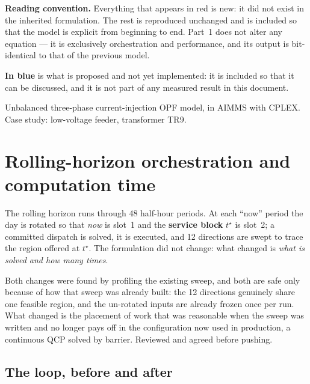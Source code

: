 \documentclass[11pt,a4paper]{article}
\newcommand{\nw}[1]{\textcolor{uaired}{#1}}
\newcommand{\prop}[1]{\textcolor{propblue}{#1}}
\newcommand{\tstar}{t^{\star}}
\begin{document}
\begin{keybox}
\textbf{Reading convention.} Everything that appears \nw{in red} is \nw{new}: it did not exist in the
inherited formulation. The rest is reproduced unchanged and is included so that the model is
explicit from beginning to end. Part~1 does not alter any equation --- it is exclusively
orchestration and performance, and its output is bit-identical to that of the previous model.

\vspace{2pt}
\textbf{\prop{In blue}} is what is \prop{proposed and not yet implemented}: it is included so that it can be discussed, and it is not part of any measured result in this document.
\end{keybox}

\vspace{3mm}
{\footnotesize\color{faint}
Unbalanced three-phase current-injection OPF model, in AIMMS with CPLEX.
Case study: low-voltage feeder, transformer TR9.\par}


\newpage

\section{Rolling-horizon orchestration and computation time}

The rolling horizon runs through 48 half-hour periods. At each ``now'' period the day is rotated so
that \emph{now} is slot~1 and the \textbf{service block} $\tstar$ is slot~2; a committed dispatch is
solved, it is executed, and 12 directions are swept to trace the region offered at $\tstar$. The
formulation did not change: what changed is \emph{what is solved and how many times}.

Both changes were found by profiling the existing sweep, and both are safe only because of how that
sweep was already built: the 12 directions genuinely share one feasible region, and the un-rotated
inputs are already frozen once per run. What changed is the placement of work that was reasonable
when the sweep was written and no longer pays off in the configuration now used in production, a
continuous QCP solved by barrier. Reviewed and agreed before pushing.

\subsection{The loop, before and after}
\end{document}

